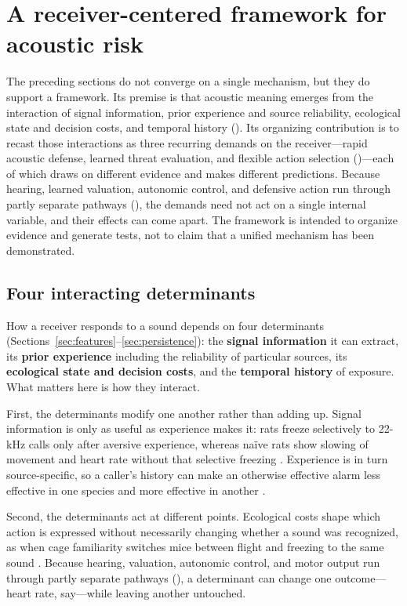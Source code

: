 \section{A receiver-centered framework for acoustic risk}
\label{sec:account}

The preceding sections do not converge on a single mechanism, but they do support a framework. Its premise is that acoustic meaning emerges from the interaction of signal information, prior experience and source reliability, ecological state and decision costs, and temporal history (). Its organizing contribution is to recast those interactions as three recurring demands on the receiver---rapid acoustic defense, learned threat evaluation, and flexible action selection ()---each of which draws on different evidence and makes different predictions. Because hearing, learned valuation, autonomic control, and defensive action run through partly separate pathways (), the demands need not act on a single internal variable, and their effects can come apart. The framework is intended to organize evidence and generate tests, not to claim that a unified mechanism has been demonstrated.

\subsection{Four interacting determinants}
\label{sec:account-determinants}

How a receiver responds to a sound depends on four determinants (Sections~\ref{sec:features}--\ref{sec:persistence}): the \textbf{signal information} it can extract, its \textbf{prior experience} including the reliability of particular sources, its \textbf{ecological state and decision costs}, and the \textbf{temporal history} of exposure. What matters here is how they interact.

First, the determinants modify one another rather than adding up. Signal information is only as useful as experience makes it: rats freeze selectively to 22-kHz calls only after aversive experience, whereas naïve rats show slowing of movement and heart rate without that selective freezing \citep{KimEtAl2010,OlszynskiEtAl2020}. Experience is in turn source-specific, so a caller's history can make an otherwise effective alarm less effective in one species and more effective in another \citep{HareAtkins2001,BlumsteinEtAl2004}.

Second, the determinants act at different points. Ecological costs shape which action is expressed without necessarily changing whether a sound was recognized, as when cage familiarity switches mice between flight and freezing to the same sound \citep{MongeauEtAl2003}. Because hearing, valuation, autonomic control, and motor output run through partly separate pathways (), a determinant can change one outcome---heart rate, say---while leaving another untouched.

